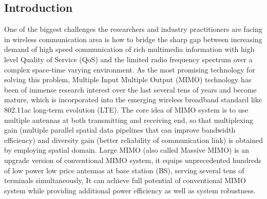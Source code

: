 \documentclass[12pt, draftclsnofoot, onecolumn]{IEEEtran}
\begin{document}
\begin{spacing}{2}
\section{Introduction}
% 
% 
% 
% 

 
  One of the biggest challenges the researchers and industry practitioners are facing in wireless communication area is how to bridge the sharp gap between increasing demand of high speed communication of rich multimedia information with high level Quality of Service (QoS) and the limited radio frequency spectrum over a complex space-time varying environment. As the most promising technology for solving this problem, Multiple Input Multiple Output (MIMO) technology has been of immense research interest over the last several tens of years and become mature, which is incorporated into the emerging wireless broadband standard like 802.11ac\cite{IEEE802.11ac} long-term evolution (LTE)\cite{3GLTE}.  The core idea of MIMO system is to use multiple antennas at both transmitting and receiving end, so that multiplexing gain (multiple parallel spatial data pipelines that can improve bandwidth efficiency) and diversity gain (better reliability of communication link) is obtained by employing spatial domain. Large MIMO (also called Massive MIMO) is an upgrade version of conventional MIMO system, it equips unprecedented hundreds of low power low price antennas at base station (BS), serving several tens of terminals simultaneously, It can achieve full potential of conventional MIMO system while providing additional power efficiency as well as system robustness\cite{rusek2013scaling}\cite{larsson2014massive}. 
    

\end{spacing}
\end{document}
